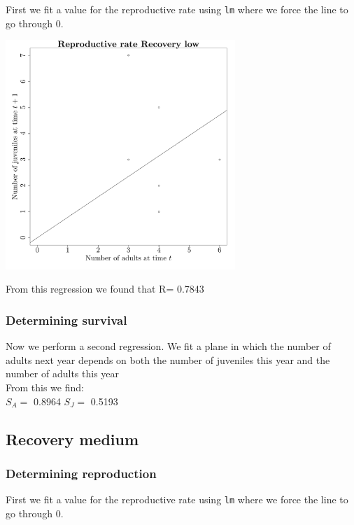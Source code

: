 \documentclass{article}\usepackage[]{graphicx}\usepackage[]{color}
\begin{document}
First we fit a value for the reproductive rate using \texttt{lm} where we force the line to go through $0$. 



{\centering \includegraphics[width=0.65\textwidth]{figure/k511} 

}



 From this regression we found that R= 0.7843 

\subsubsection{Determining survival}

Now we perform a second regression. We fit a plane in which the number of adults next year depends on both the number of juveniles this year and the number of adults this year\\From this we find:\\ 
$S_A=$ 0.8964 
$S_J=$ 0.5193 
\subsection{ Recovery medium }
\subsubsection{Determining reproduction}

First we fit a value for the reproductive rate using \texttt{lm} where we force the line to go through $0$. 
\end{document}
